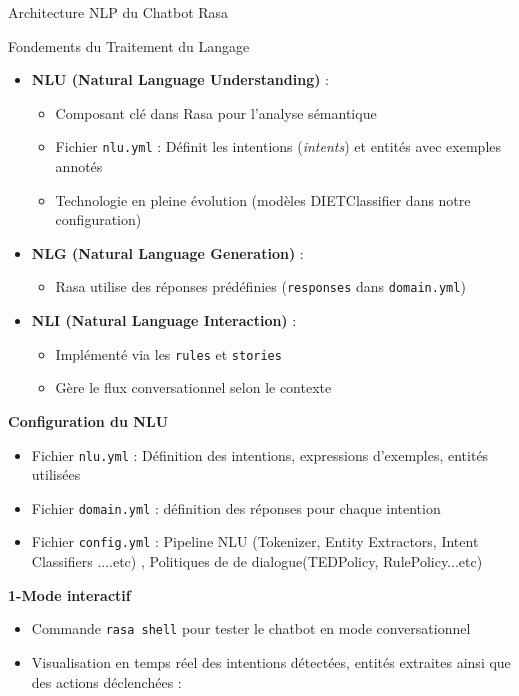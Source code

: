 \textbf{}{Architecture NLP du Chatbot Rasa}

\textbf{}{Fondements du Traitement du Langage}
\begin{itemize}
    \item \textbf{NLU (Natural Language Understanding)} :
    \begin{itemize}
        \item Composant clé dans Rasa pour l'analyse sémantique
        \item Fichier \texttt{nlu.yml} : Définit les intentions (\textit{intents}) et entités avec exemples annotés
        \item Technologie en pleine évolution (modèles DIETClassifier dans notre configuration)
    \end{itemize}

    \item \textbf{NLG (Natural Language Generation)} :
    \begin{itemize}
        \item Rasa utilise des réponses prédéfinies (\texttt{responses} dans \texttt{domain.yml})
    \end{itemize}

    \item \textbf{NLI (Natural Language Interaction)} :
    \begin{itemize}
        \item Implémenté via les \texttt{rules} et \texttt{stories}
        \item Gère le flux conversationnel selon le contexte
    \end{itemize}
\end{itemize}



\textbf{Configuration du NLU}
\begin{itemize}
    \item Fichier \texttt{nlu.yml} : Définition des intentions, expressions d'exemples, entités utilisées
    \item Fichier \texttt{domain.yml} : définition des réponses pour chaque intention
    \item Fichier \texttt{config.yml} : Pipeline NLU (Tokenizer, Entity Extractors, Intent Classifiers ....etc) , Politiques de de dialogue(TEDPolicy, RulePolicy...etc)
    \end{itemize}


\textbf{1-Mode interactif}
\begin{itemize}
    \item Commande \texttt{rasa shell} pour tester le chatbot en mode conversationnel
    \item Visualisation en temps réel des intentions détectées, entités extraites ainsi que des actions déclenchées :
\end{itemize}

